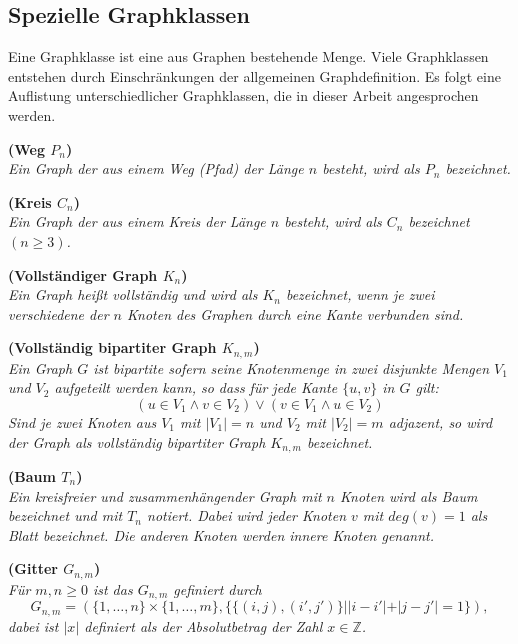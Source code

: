 \newpage
\subsection{Spezielle Graphklassen}
Eine Graphklasse ist eine aus Graphen bestehende Menge. Viele Graphklassen entstehen durch Einschränkungen der allgemeinen Graphdefinition. Es folgt eine Auflistung unterschiedlicher Graphklassen, die in dieser Arbeit angesprochen werden.
\begin{defi}{\textbf{(Weg $P_n$)}}\\
\emph{Ein Graph der aus einem Weg (Pfad) der Länge $n$ besteht, wird als $P_n$ bezeichnet.} \end{defi}

\begin{defi}{\textbf{(Kreis $C_n$)}}\\
\emph{Ein Graph der aus einem Kreis der Länge $n$ besteht, wird als $C_n$ bezeichnet $(n \geq 3)$.} \end{defi}

\begin{defi}{\textbf{(Vollständiger Graph $K_n$)}}\\
\emph{Ein Graph heißt vollständig und wird als $K_n$ bezeichnet, wenn je zwei verschiedene der $n$ Knoten des Graphen durch eine Kante verbunden sind.} 
\end{defi}


\begin{defi}{\textbf{(Vollständig bipartiter Graph $K_{n,m}$)}}\\
\emph{Ein Graph $G$ ist bipartite sofern seine Knotenmenge in zwei disjunkte Mengen $V_1$ und $V_2$ aufgeteilt werden kann, so dass für jede Kante $\{u,v\}$ in $G$ gilt: $$(u \in V_1 \wedge v \in V_2)\vee (v \in V_1 \wedge u \in V_2)$$Sind je zwei Knoten aus $V_1$ mit $|V_1|=n$ und $V_2$ mit $|V_2|=m$ adjazent, so wird der Graph als vollständig bipartiter Graph $K_{n,m}$ bezeichnet. } \end{defi}


\begin{defi}{\textbf{(Baum $T_n$)}}\\
\emph{Ein kreisfreier und zusammenhängender Graph mit $n$ Knoten wird als Baum bezeichnet und mit $T_n$ notiert. Dabei wird jeder Knoten $v$ mit $deg(v)=1$ als Blatt bezeichnet. Die anderen Knoten werden innere Knoten genannt.} \end{defi}


\begin{defi}{\textbf{(Gitter $G_{n,m}$)}}\\
\emph{Für $m,n \geq 0$ ist das $G_{n,m}$ gefiniert durch $$G_{n,m}=(\{1,\ldots,n\}\times\{1,\ldots ,m\},\{\{(i,j),(i',j')\}||i-i'|+|j-j'|=1\} ),$$ dabei ist $|x|$ definiert als der Absolutbetrag der Zahl $x \in \mathbb{Z}$.\cite{exaktealgorithmenfuerschweregraphenprobleme} 
}\end{defi}


